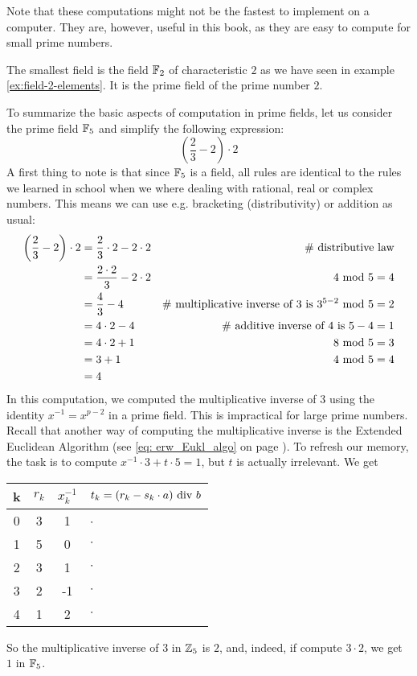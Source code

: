 Note that these computations might not be the fastest to implement on a computer. They are, however, useful in this book, as they are easy to compute for small prime numbers.
\begin{example}
The smallest field is the field $\mathbb{F}_2$ of characteristic $2$ as we have seen in example \ref{ex:field-2-elements}. It is the prime field of the prime number $2$.
\end{example}
\begin{example}\label{prime-field-F5}
To summarize the basic aspects of computation in prime fields, let us consider the prime field $\mathbb{F}_5$ and simplify the following expression:
$$\left(\frac{2}{3} - 2\right)\cdot 2 $$
A first thing to note is that since $\mathbb{F}_5$ is a field, all rules are identical to the rules we learned in school when we where dealing with rational, real or complex numbers. This means we can use e.g.  bracketing (distributivity) or addition as usual:
\begin{align*}
\left(\frac{2}{3} - 2\right)\cdot 2 &=
 \frac{2}{3}\cdot 2 - 2\cdot 2 & \text{\# distributive law}\\
 &= \frac{2\cdot 2}{3} - 2\cdot 2 & 4 \text{ mod } 5=4 \\
 &= \frac{4}{3} - 4 & \text{\# multiplicative inverse of 3 is } 3^{5-2} \text{ mod } 5=2\\
 &= 4\cdot 2 - 4 & \text{\# additive inverse of 4 is } 5-4=1\\
 &= 4\cdot 2 +1 & 8 \text{ mod } 5=3\\
 &= 3 +1 & 4 \text{ mod } 5=4\\
 &= 4
\end{align*}
In this computation, we computed the multiplicative inverse of $3$ using the identity
$x^{-1}=x^{p-2}$ in a prime field. This is impractical for large prime numbers. Recall that another way of computing the multiplicative inverse is the Extended Euclidean Algorithm (see \ref{eq: erw_Eukl_algo} on page \pageref{eq: erw_Eukl_algo}).  To refresh our memory, the task is to compute $x^{-1}\cdot 3 + t \cdot 5 =1$, but $t$ is actually irrelevant. We get
\begin{center}
  \begin{tabular}{c | c c l}
    k & $ r_k $ & $ x^{-1}_k $ & $ t_k = (r_k-s_k \cdot a) \text{ div } b $ \\\hline
    0 & 3 & 1 & $\cdot$\ \\
    1 & 5 & 0 & $\cdot$ \\
    2 & 3 & 1 & $\cdot$ \\
    3 & 2 &-1 & $\cdot$ \\
    4 & 1 & 2  & $\cdot$ \\
  \end{tabular}
\end{center}
So the multiplicative inverse of $3$ in $\mathbb{Z}_5$ is $2$, and, indeed, if compute $3\cdot 2$, we get $1$ in $\mathbb{F}_5$.
\end{example}
